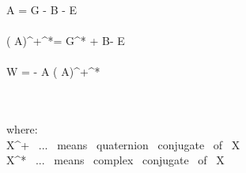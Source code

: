 \widehat{ \Box } \widehat A =  G - \vec B - \imath{} \vec E \\\\

(\widehat{ \Box } \widehat A)^+^*=  G^* + \vec B-\imath{} \vec E \\\\

\widehat W =  -  \widehat{ \Box } \widehat A (\widehat{ \Box } \widehat A)^+^*


\\\\

where: 
\\
\widehat X^+ \ ... \ means \ quaternion \ conjugate \ of \ \widehat X
\\
\widehat X^* \ ...  \ means \ complex \ conjugate \ of \ \widehat X  


